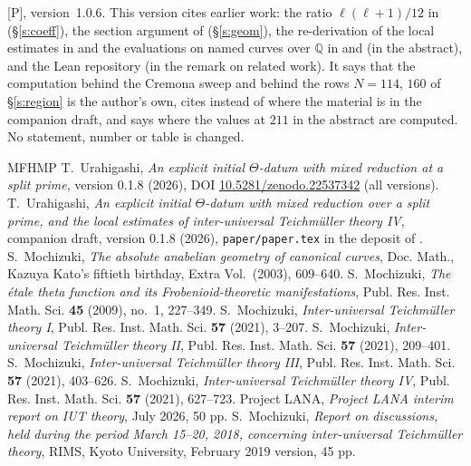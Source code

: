 \documentclass[11pt]{article}
\theoremstyle{plain}
\theoremstyle{definition}
\begin{document}
\textup{[P], version~1.0.6.}  This version cites earlier work: the ratio
$\ell(\ell+1)/12$ in \cite{DHPS} (\S\ref{s:coeff}), the section argument of
\cite{DH25} (\S\ref{s:geom}), the re-derivation of the local estimates in \cite{Zhou}
and the evaluations on named curves over $\mathbb{Q}$ in \cite{TK} and \cite{Mor} (in the
abstract), and the Lean repository \cite{LANAiut} (in the remark on related work).  It
says that the computation behind the Cremona sweep and behind the rows $N=114$, $160$
of \S\ref{s:region} is the author's own, cites \cite{Firstfull} instead of
\cite{First} where the material is in the companion draft, and says where the values
at $211$ in the abstract are computed.  No statement, number or table is changed.

\begin{thebibliography}{MFHMP}
 T.~Urahigashi, \emph{An explicit initial $\Theta$-datum with
 mixed reduction at a split prime}, version 0.1.8 (2026),
 DOI \href{https://doi.org/10.5281/zenodo.22537342}{10.5281/zenodo.22537342}
 (all versions).
 T.~Urahigashi, \emph{An explicit initial
 $\Theta$-datum with mixed reduction over a split prime, and the local estimates of
 inter-universal Teichm\"uller theory IV}, companion draft, version 0.1.8 (2026),
 \texttt{paper/paper.tex} in the deposit of \cite{First}.
 S.~Mochizuki, \emph{The absolute anabelian geometry of
 canonical curves}, Doc. Math., Kazuya Kato's fiftieth birthday, Extra Vol.\
 (2003), 609--640.
 S.~Mochizuki, \emph{The \'etale theta function and its
 Frobenioid-theoretic manifestations}, Publ. Res. Inst. Math. Sci. \textbf{45}
 (2009), no.~1, 227--349.
 S.~Mochizuki, \emph{Inter-universal Teichm\"uller theory I},
 Publ. Res. Inst. Math. Sci. \textbf{57} (2021), 3--207.
 S.~Mochizuki, \emph{Inter-universal Teichm\"uller theory II},
 Publ. Res. Inst. Math. Sci. \textbf{57} (2021), 209--401.
 S.~Mochizuki, \emph{Inter-universal Teichm\"uller theory III},
 Publ. Res. Inst. Math. Sci. \textbf{57} (2021), 403--626.
 S.~Mochizuki, \emph{Inter-universal Teichm\"uller theory IV},
 Publ. Res. Inst. Math. Sci. \textbf{57} (2021), 627--723.
 Project LANA, \emph{Project LANA interim report on IUT
 theory}, July 2026, 50 pp.
 S.~Mochizuki, \emph{Report on discussions, held during the period
 March 15--20, 2018, concerning inter-universal Teichm\"uller theory}, RIMS, Kyoto
 University, February 2019 version, 45 pp.

\end{thebibliography}
\end{document}
